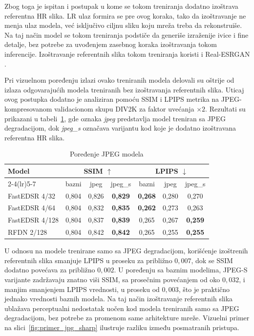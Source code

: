 \documentclass[12pt,a4paper]{article}
\begin{document}
Zbog toga je ispitan i postupak u kome se tokom treniranja dodatno izoštrava referentna HR slika. LR ulaz formira se pre ovog koraka, tako da izoštravanje ne menja ulaz modela, već isključivo ciljnu sliku koju mreža treba da rekonstruiše. Na taj način model se tokom treniranja podstiče da generiše izraženije ivice i fine detalje, bez potrebe za uvođenjem zasebnog koraka izoštravanja tokom inferencije. Izoštravanje referentnih slika tokom treniranja koristi i Real-ESRGAN \cite{RealESRGAN}.

Pri vizuelnom poređenju izlazi ovako treniranih modela delovali su oštrije od izlaza odgovarajućih modela treniranih bez izoštravanja referentnih slika. Uticaj ovog postupka dodatno je analiziran pomoću SSIM i LPIPS metrika na JPEG-kompresovanom validacionom skupu DIV2K za faktor uvećanja $\times2$. Rezultati su prikazani u tabeli~\ref{tab:jpeg_DIV2K_jpeg_vs_s_2}, gde oznaka \textit{jpeg} predstavlja model treniran sa JPEG degradacijom, dok \textit{jpeg\_s} označava varijantu kod koje je dodatno izoštravana referentna HR slika.

\begin{table}[H]
	\centering
	\small
	\setlength{\tabcolsep}{8pt}
	\begin{tabular}{lcccccc}
		\toprule
		Model & \multicolumn{3}{c}{SSIM $\uparrow$} & \multicolumn{3}{c}{LPIPS $\downarrow$} \\
		\cmidrule(lr){2-4}\cmidrule(lr){5-7}
		& bazni & jpeg & jpeg\_s & bazni & jpeg & jpeg\_s \\
		\midrule
		FastEDSR 4/32 & 0,804 & 0,826 & \textbf{0,829} & \textbf{0,268} & 0,280 & 0,270 \\
		FastEDSR 4/64 & 0,804 & 0,832 & \textbf{0,835} & \textbf{0,262} & 0,273 & 0,263 \\
		FastEDSR 4/128 & 0,804 & 0,837 & \textbf{0,839} & 0,265 & 0,267 & \textbf{0,259} \\
		RFDN 2/128 & 0,804 & 0,842 & \textbf{0,842} & 0,265 & 0,255 & \textbf{0,255} \\
		\bottomrule
	\end{tabular}
	\caption{Poređenje JPEG modela}
	\label{tab:jpeg_DIV2K_jpeg_vs_s_2}
\end{table}

U odnosu na modele trenirane samo sa JPEG degradacijom, korišćenje izoštrenih referentnih slika smanjuje LPIPS u proseku za približno $0{,}007$, dok se SSIM dodatno povećava za približno $0{,}002$. U poređenju sa baznim modelima, JPEG-S varijante zadržavaju znatno viši SSIM, sa prosečnim povećanjem od oko $0{,}032$, i manjim smanjenjem LPIPS vrednosti, u proseku od $0{,}003$, što je praktično jednako vrednosti baznih modela. Na taj način izoštravanje referentnih slika ublažava perceptualni nedostatak uočen kod modela treniranih samo sa JPEG degradacijom, bez potrebe za promenom same arhitekture mreže. Vizuelni primer na slici~\ref{fig:primer_jpg_sharp} ilustruje razliku između posmatranih pristupa.
\end{document}
